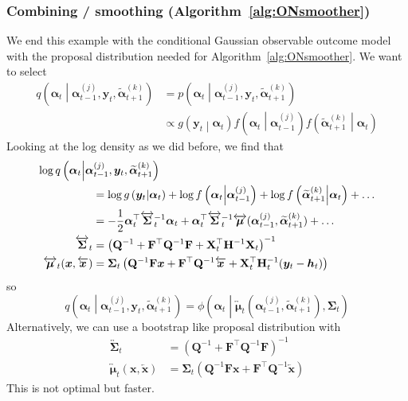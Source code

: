 \documentclass[notitlepage]{article}
\renewcommand{\vec}[1]{\bm{#1}}
\newcommand{\vecLarrow}[1]{\overleftarrow{\vec{#1}}}
\newcommand{\vecLRarrow}[1]{\overleftrightarrow{\vec{#1}}}
\newcommand{\mat}[1]{\mathbf{#1}}
\newcommand{\matLRarrow}[1]{\overleftrightarrow{\mat{#1}}}
\newcommand{\Lparen}[1]{\left( #1\right)}
\newcommand{\Cond}[2]{ #1 \middle\vert  #2}
\newcommand{\optor}[2]{#1\Lparen{#2}}
\newcommand{\optorC}[3]{\optor{#1}{\Cond{#2}{#3}}}
\newcommand{\pdensC}[2]{\optorC{p}{#1}{#2}}
\newcommand{\normaldC}[3]{\optorC{\phi}{#1}{#2,#3}}
\newcommand{\IDC}[2]{\optorC{q}{#1}{#2}}
\newcommand{\partic}[3]{#1_{#2}^{\Lparen{#3}}}
\newcommand{\particB}[3]{\widetilde{#1}_{#2}^{\Lparen{#3}}}
\begin{document}
\subsubsection*{Combining / smoothing (Algorithm~\ref{alg:ONsmoother})}
We end this example with the conditional Gaussian observable outcome model with the 
proposal distribution needed for Algorithm~\ref{alg:ONsmoother}. We want to select 
%
\begin{align*}
\IDC{\vec\alpha_t}{\partic{\vec{\alpha}}{t-1}{j},\vec{y}_t, \particB{\vec{\alpha}}{t+1}{k}} &=
		\pdensC{\vec{\alpha}_t}{\partic{\vec{\alpha}}{t-1}{j},\vec{y}_t, \particB{\vec{\alpha}}{t+1}{k}} \\
&\propto \optorC{g}{\vec{y}_t}{\vec\alpha_t}
		\optorC{f}{\vec{\alpha}_t}{\partic{\vec{\alpha}}{t-1}{j}}
		\optorC{f}{\particB{\vec{\alpha}}{t+1}{k}}{\vec{\alpha}_t}
\end{align*}
%
Looking at the log density as we did before, we find that %
%
\begin{align}
\log\IDC{\vec\alpha_t}{\partic{\vec{\alpha}}{t-1} j,\vec y_t,
 \particB{\vec{\alpha}}{t+1}k} 
	\hspace{-60pt}& \nonumber\\
&=\log\optorC{g}{\vec{y}_t}{\vec\alpha_t}
	+ \log\optorC{f}{\vec{\alpha}_t}{\partic{\vec{\alpha}}{t-1}{j}}
	+ \log\optorC{f}{\particB{\vec{\alpha}}{t+1}{k}}{\vec{\alpha}_t} 		
	+ \dots \nonumber\\
& = - \frac 12 \vec\alpha_t^\top \matLRarrow\Sigma^{-1}_t\vec\alpha_t
		+ \vec\alpha_t^\top \matLRarrow\Sigma_t^{-1}\vecLRarrow\mu(
			\partic{\vec{\alpha}}{t-1} j,
			\particB{\vec\alpha}{t + 1}k) + \dots \nonumber\\
\matLRarrow\Sigma_t &= \Lparen{\mat Q^{-1} + \mat F^\top\mat Q^{-1}\mat F + 
		\mat X_t^\top \mat H^{-1} \mat X_t}^{-1} \label{eq:normalSmoothPropCov}\\
\vecLRarrow\mu_t(\vec x, \vecLarrow x) &= \mat\Sigma_t\Lparen{
	\mat Q^{-1}\mat F\vec x + \mat F^\top \mat Q^{-1}\vecLarrow x + 
	\mat X_t^\top\mat H_t^{-1}(\vec y_t - \vec h_t)} \label{eq:normalSmoothPropMean}
\end{align}%
% 
so 
%
$$
\IDC{\vec\alpha_t}{\partic{\vec{\alpha}}{t-1} j,\vec y_t,
 \particB{\vec{\alpha}}{t+1}k} = 
 	\normaldC{\vec\alpha_t}{
		\vecLRarrow\mu_t(\partic{\vec{\alpha}}{t-1} j, 
			\particB{\vec{\alpha}}{t + 1}k)}{\mat\Sigma_t}
$$
%
Alternatively, we can use a bootstrap like proposal distribution with%
% 
\begin{align*}
\matLRarrow\Sigma_t &= \Lparen{\mat Q^{-1} + \mat F^\top\mat Q^{-1}\mat F}^{-1} \\
\vecLRarrow\mu_t(\vec x, \vecLarrow x) &= \mat\Sigma_t\Lparen{
	\mat Q^{-1}\mat F\vec x + \mat F^\top \mat Q^{-1}\vecLarrow x}
\end{align*}%
% 
This is not optimal but faster.
\end{document}
